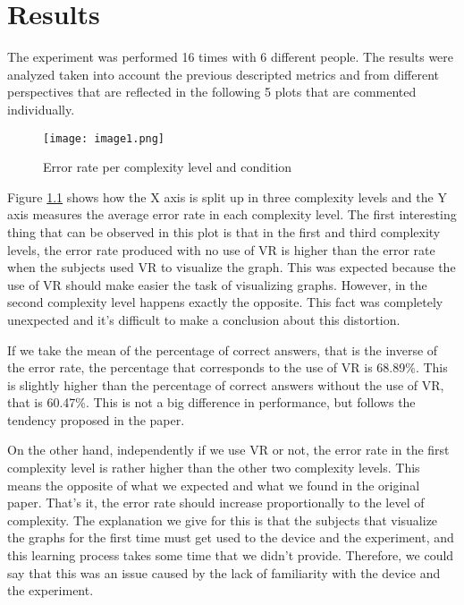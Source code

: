 \chapter{Results}

The experiment was performed 16 times with 6 different people. The
results were analyzed taken into account the previous descripted metrics
and from different perspectives that are reflected in the following 5
plots that are commented individually.

\begin{figure}[!ht]
\centering
\texttt{[image: image1.png]}
\caption{Error rate per complexity level and condition} \label{fig:plot1}
\end{figure}

Figure \ref{fig:plot1} shows how the X axis is split up in three complexity
levels and the Y axis measures the average error rate in each complexity
level. The first interesting thing that can be observed in this plot is
that in the first and third complexity levels, the error rate produced
with no use of VR is higher than the error rate when the subjects used
VR to visualize the graph. This was expected because the use of VR
should make easier the task of visualizing graphs. However, in the
second complexity level happens exactly the opposite. This fact was
completely unexpected and it's difficult to make a conclusion about this
distortion.

If we take the mean of the percentage of correct answers, that is the
inverse of the error rate, the percentage that corresponds to the use of
VR is 68.89\%. This is slightly higher than the percentage of correct
answers without the use of VR, that is 60.47\%. This is not a big
difference in performance, but follows the tendency proposed in the
paper.

\protect\hypertarget{transcription-of-the-thomas-talk-last-pr}{}{}On the
other hand, independently if we use VR or not, the error rate in the
first complexity level is rather higher than the other two complexity
levels. This means the opposite of what we expected and what we found in
the original paper. That's it, the error rate should increase
proportionally to the level of complexity. The explanation we give for
this is that the subjects that visualize the graphs for the first time
must get used to the device and the experiment, and this learning
process takes some time that we didn't provide. Therefore, we could say
that this was an issue caused by the lack of familiarity with the device
and the experiment.

